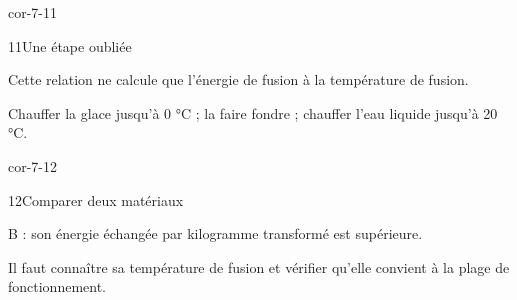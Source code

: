 \begin{blocLivre}{cor-7-11}\begin{corrige}{11}{Une étape oubliée}
\begin{questions}
\item Cette relation ne calcule que l’énergie de fusion à la température de fusion.
\item Chauffer la glace jusqu’à 0 °C ; la faire fondre ; chauffer l’eau liquide jusqu’à 20 °C.
\end{questions}
\end{corrige}\end{blocLivre}
\begin{blocLivre}{cor-7-12}\begin{corrige}{12}{Comparer deux matériaux}
\begin{questions}
\item B : son énergie échangée par kilogramme transformé est supérieure.
\item Il faut connaître sa température de fusion et vérifier qu’elle convient à la plage de fonctionnement.
\end{questions}
\end{corrige}\end{blocLivre}

